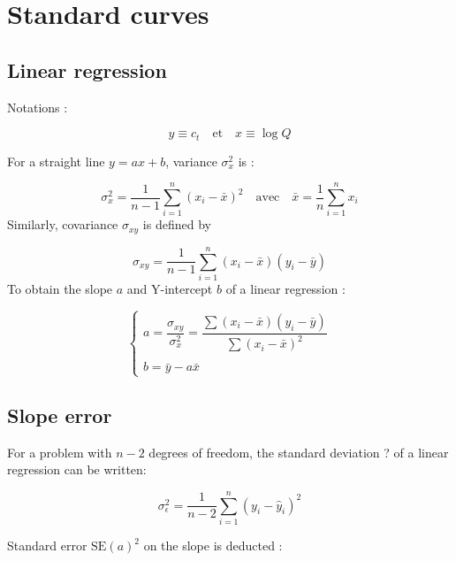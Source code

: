 \documentclass[a4paper,10pt]{article}
\begin{document}
\section{Standard curves}

\subsection{Linear regression}

Notations :

\begin{equation}
 y\equiv c_t \quad \text{et} \quad x\equiv\log Q
\end{equation}

For a straight line $y=ax+b$, variance $\sigma_x^2$ is :

\begin{equation}
\sigma_x^2=\displaystyle\frac{1}{n-1}\sum_{i=1}^{n}(x_i-\bar{x})^2
\quad\text{avec}\quad \bar{x}=\frac{1}{n}\sum_{i=1}^{n}x_i
\end{equation}
Similarly, covariance $\sigma_{xy}$ is defined by

\begin{equation}
 \sigma_{xy} =
\displaystyle\frac{1}{n-1}\sum_{i=1}^{n}(x_i-\bar{x})(y_i-\bar{y})
\end{equation}
To obtain the slope $a$ and Y-intercept $b$ of a linear regression :

\begin{equation}
 \left\lbrace 
\begin{array}{l}
 a = \dfrac{\sigma_{xy}}{\sigma_x^2}=\dfrac{\sum(x_i-\bar{x})(y_i-\bar{y})}{\sum(x_i-\bar{x})^2} \\ \\
 b = \bar{y}-a\bar{x}
\end{array}
\right.
\end{equation}


\subsection{Slope error}

For a problem with $n-2$ degrees of freedom, the standard deviation ? of a linear regression can be written: 

\begin{equation}
 \sigma_{\epsilon}^2 = \displaystyle\frac{1}{n-2}\sum_{i=1}^{n}(y_i-\hat{y}_i)^2
\end{equation}

Standard error $\text{SE}(a)^2$ on the slope is deducted : 
\end{document}
